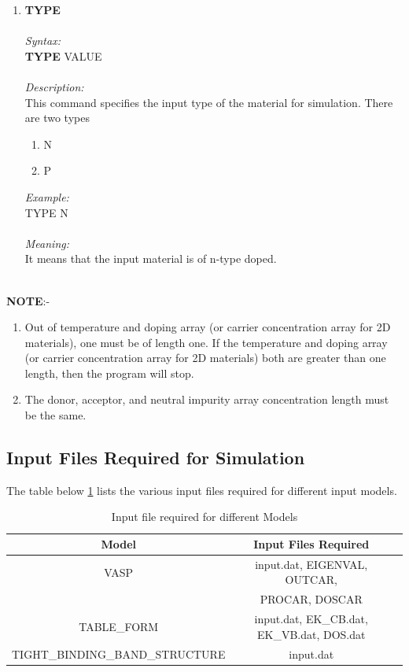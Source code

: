 \documentclass[12pt]{article}
\begin{document}
\begin{enumerate}
 
    \item \textbf{TYPE} \\ \\
    \textit{Syntax:} \\
    \textbf{TYPE} VALUE \\ \\
    \textit{Description:} \\
    This command specifies the input type of the material for simulation. There are two types 
    \begin{enumerate}
        \item N
        \item P
    \end{enumerate}
    \textit{Example:} \\
    TYPE N \\ \\
    \textit{Meaning:} \\    
    It means that the input material is of n-type doped. \\ \\

\end{enumerate}

    \textbf{NOTE}:-
    \begin{enumerate}

    \item Out of temperature and doping array (or carrier concentration array for 2D materials), one must be of length one. If the temperature and doping array (or carrier concentration array for 2D materials) both are greater than one length, then the program will stop. 
    \item The donor, acceptor, and neutral impurity array concentration length must be the same. 
    \end{enumerate}
    
    \subsection{Input Files Required for Simulation}  
    The table below \ref{input_files_table} lists the various input files required for different input models.
    
\begin{table} [H]
\caption{ Input file required for different Models}
\label{input_files_table}
\begin{tabular}{|c|c|c|}
\hline
\textbf{Model} & \textbf{Input Files Required}   \\
\hline                                      
VASP   & input.dat, EIGENVAL, OUTCAR, \\
& PROCAR, DOSCAR \\
\hline   
TABLE\_FORM & input.dat, EK\_CB.dat, EK\_VB.dat, DOS.dat    \\
\hline  
TIGHT\_BINDING\_BAND\_STRUCTURE   & input.dat     \\
\hline
\end{tabular}
\end{table}
\end{document}
